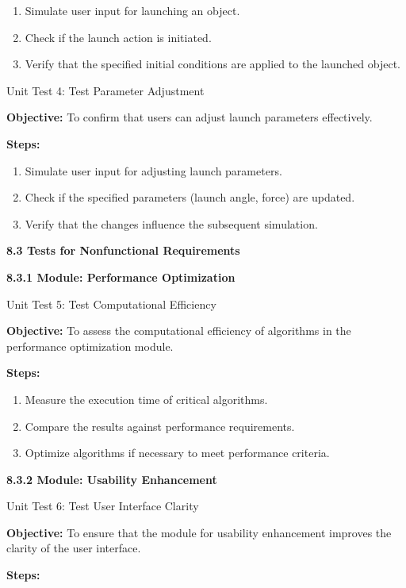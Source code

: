 \documentclass[
]{article}
\begin{document}
\begin{enumerate}
\def\labelenumi{\arabic{enumi}.}
\item
  Simulate user input for launching an object.
\item
  Check if the launch action is initiated.
\item
  Verify that the specified initial conditions are applied to the
  launched object.
\end{enumerate}

Unit Test 4: Test Parameter Adjustment

\textbf{Objective:} To confirm that users can adjust launch parameters
effectively.

\textbf{Steps:}

\begin{enumerate}
\def\labelenumi{\arabic{enumi}.}
\item
  Simulate user input for adjusting launch parameters.
\item
  Check if the specified parameters (launch angle, force) are updated.
\item
  Verify that the changes influence the subsequent simulation.
\end{enumerate}

\textbf{8.3 Tests for Nonfunctional Requirements}

\textbf{8.3.1 Module: Performance Optimization}

Unit Test 5: Test Computational Efficiency

\textbf{Objective:} To assess the computational efficiency of algorithms
in the performance optimization module.

\textbf{Steps:}

\begin{enumerate}
\def\labelenumi{\arabic{enumi}.}
\item
  Measure the execution time of critical algorithms.
\item
  Compare the results against performance requirements.
\item
  Optimize algorithms if necessary to meet performance criteria.
\end{enumerate}

\textbf{8.3.2 Module: Usability Enhancement}

Unit Test 6: Test User Interface Clarity

\textbf{Objective:} To ensure that the module for usability enhancement
improves the clarity of the user interface.

\textbf{Steps:}
\end{document}
